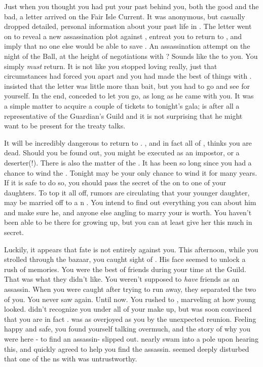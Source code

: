 \documentclass[char]{NeptuneBall}
\begin{document}
Just when you thought you had put your past behind you, both the good and the bad, a letter arrived on the Fair Isle Current. It was anonymous, but casually dropped detailed, personal information about your past life in \pAtlantis{}. The letter went on to reveal a new assassination plot against \cKing{}, entreat you to return to \pAtlantis{}, and imply that no one else would be able to save \cKing{}. An assassination attempt on the night of the \cExExKing{} Ball, at the height of negotiations with \pPacifica{}? Sounds like the \pAssassin{} to you. You simply \emph{must} return. It is not like you stopped loving \cKing{} really, just that circumstances had forced you apart and you had made the best of things with \cGeneral{}. \cGeneral{} insisted that the letter was little more than bait, but you had to go and see for yourself.  In the end, \cGeneral{} conceded to let you go, as long as he came with you. It was a simple matter to acquire a couple of tickets to tonight's gala; \cGeneral{} is after all a representative of the Guardian's Guild and it is not surprising that he might want to be present for the treaty talks.

It will be incredibly dangerous to return to \pAtlantis{}. \cKing{}, and in fact all of \pAtlantis{}, thinks you are dead. Should you be found out, you might be executed as an impostor, or a deserter(!).  There is also the matter of the \iMusicBox{\MYname}. It has been so long since you had a chance to wind the \iMusicBox{\MYname}. Tonight may be your only chance to wind it for many years. If it is safe to do so, you should pass the secret of the \iMusicBox{\MYname} on to one of your daughters. To top it all off, rumors are circulating that your younger daughter, \cPrincess{} may be married off to a \pPacifica{}n \cPrince{\prince}. You intend to find out everything you can about him and make sure he, and anyone else angling to marry your \cPrincess{\offspring} is worth. You haven't been able to be there for \cPrincess{} growing up, but you can at least give her this much in secret.

Luckily, it appears that fate is not entirely against you. This afternoon, while you strolled through the bazaar, you caught sight of \cDiplomat{}. His face seemed to unlock a rush of memories. You were the best of friends during your time at the Guild.  That was what they didn't like. You weren't supposed to \emph{have} friends as an assassin.  When you were caught after trying to run away, they separated the two of you. You never saw \cDiplomat{\them} again. Until now. You rushed to \cDiplomat{\them}, marveling at how young \cDiplomat{\they} looked. \cDiplomat{} didn't recognize you under all of your make up, but was soon convinced that you are in fact \cQueen{}. \cDiplomat{\They} was as overjoyed as you by the unexpected reunion. Feeling happy and safe, you found yourself talking overmuch, and the story of why you were here - to find an assassin- slipped out. \cDiplomat{} nearly swam into a pole upon hearing this, and quickly agreed to help you find the assassin. \cDiplomat{\They} seemed deeply disturbed that one of the \pPacifica{}ns with \cDiplomat{\them} was untrustworthy.
\end{document}
